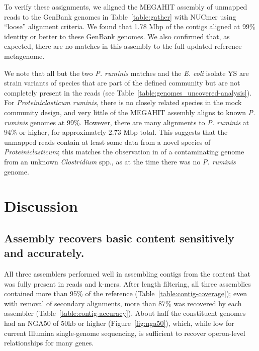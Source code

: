 \documentclass[11pt]{article}
\begin{document}
To verify these assignments, we aligned the MEGAHIT assembly of
unmapped reads to the GenBank genomes in Table~\ref{table:gather} with
NUCmer using ``loose'' alignment criteria. We found that 1.78 Mbp of
the contigs aligned at 99\% identity or better to these GenBank
genomes.  We also confirmed that, as expected, there are no matches in
this assembly to the full updated reference metagenome.

We note that all but the two {\em P. ruminis} matches and the {\em
  E. coli} isolate YS are strain variants of species that are part of
the defined community but are not completely present in the reads (see
Table~\ref{table:genomes_uncovered-analysis}).  For {\em
  Proteiniclasticum ruminis}, there is no closely related species in
the mock community design, and very little of the MEGAHIT assembly
aligns to known {\em P. ruminis} genomes at 99\%.  However, there are
many alignments to {\em P. ruminis} at 94\% or higher, for
approximately 2.73 Mbp total.  This suggests that the unmapped reads
contain at least some data from a novel species of {\em
  Proteiniclasticum}; this matches the observation in \cite{podar} of
a contaminating genome from an unknown {\em Clostridium} spp., as at the time
there was no {\em P. ruminis} genome.

\section*{Discussion}

\subsection*{Assembly recovers basic content sensitively and accurately.}

All three assemblers performed well in assembling contigs from the
content that was fully present in reads and k-mers.  After length filtering,
all three assemblies contained more than 95\% of the reference
(Table~\ref{table:contig-coverage}); even with removal of secondary
alignments, more than 87\% was recovered by each assembler
(Table~\ref{table:contig-accuracy}). About half the constituent genomes had
an NGA50 of 50kb or higher (Figure~\ref{fig:nga50}),
which, while low for current Illumina single-genome sequencing,
is sufficient to recover operon-level relationships for many genes.


\end{document}

